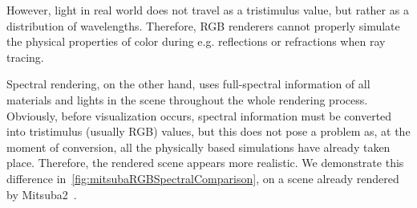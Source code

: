 However, light in real world does not travel as a tristimulus value, but rather as a distribution of wavelengths. Therefore, RGB renderers cannot properly simulate the physical properties of color during e.g. reflections or refractions when ray tracing.

Spectral rendering, on the other hand, uses full-spectral information of all materials and lights in the scene throughout the whole rendering process. Obviously, before visualization occurs, spectral information must be converted into tristimulus (usually RGB) values, but this does not pose a problem as, at the moment of conversion, all the physically based simulations have already taken place. Therefore, the rendered scene appears more realistic. We demonstrate this difference in~\cref{fig:mitsubaRGBSpectralComparison}, on a scene already rendered by Mitsuba2~\cite{Mitsuba2}.

